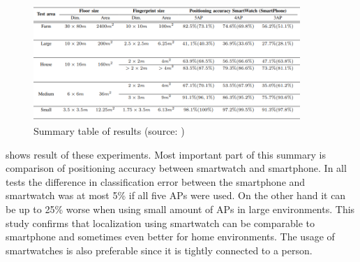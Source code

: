 \begin{figure}[H]
	\begin{centering}
		\includegraphics[width=0.9\textwidth]{img/smartwatch_vs_smartphone}
		\par\end{centering}
	\caption{Summary table of results (source: \cite{SWvsSP})\label{fig:SWvsSP}}
	\label{fig02c03}
\end{figure}

 shows result of these experiments. Most important part of this summary is comparison of positioning accuracy between smartwatch and smartphone. In all tests the difference in classification error between the smartphone and smartwatch was at most 5\% if all five APs were used. On the other hand it can be up to 25\% worse when using small amount of APs in large environments. This study confirms that localization using smartwatch can  be comparable to smartphone and sometimes even better for home environments. The usage of smartwatches is also preferable since it is tightly connected to a person.
